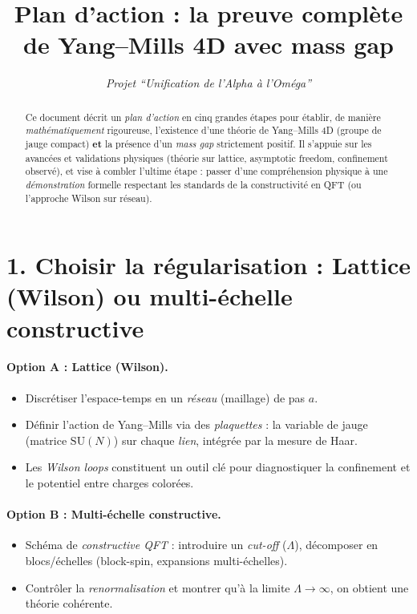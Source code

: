 \documentclass[11pt]{article}
\title{\textbf{Plan d'action : la preuve complète de Yang--Mills 4D avec mass gap}}
\author{\textit{Projet “Unification de l’Alpha à l’Oméga”}}
\date{}
\begin{document}
\maketitle

\begin{abstract}
Ce document décrit un \emph{plan d’action} en cinq grandes étapes pour établir, de manière \emph{mathématiquement} rigoureuse, l’existence d’une théorie de Yang--Mills 4D (groupe de jauge compact) \textbf{et} la présence d’un \emph{mass gap} strictement positif. Il s’appuie sur les avancées et validations physiques (théorie sur lattice, asymptotic freedom, confinement observé), et vise à combler l’ultime étape : passer d’une compréhension physique à une \emph{démonstration} formelle respectant les standards de la constructivité en QFT (ou l’approche Wilson sur réseau).
\end{abstract}

\section*{1. Choisir la régularisation : Lattice (Wilson) ou multi-échelle constructive}

\paragraph{Option A : Lattice (Wilson).}
\begin{itemize}
  \item Discrétiser l’espace-temps en un \emph{réseau} (maillage) de pas \(a\).
  \item Définir l’action de Yang--Mills via des \emph{plaquettes} : la variable de jauge (matrice \(\mathrm{SU}(N)\)) sur chaque \emph{lien}, intégrée par la mesure de Haar.
  \item Les \emph{Wilson loops} constituent un outil clé pour diagnostiquer la confinement et le potentiel entre charges colorées.
\end{itemize}

\paragraph{Option B : Multi-échelle constructive.}
\begin{itemize}
  \item Schéma de \emph{constructive QFT} : introduire un \emph{cut-off} (\(\Lambda\)), décomposer en blocs/échelles (block-spin, expansions multi-échelles).
  \item Contrôler la \emph{renormalisation} et montrer qu’à la limite \(\Lambda\to \infty\), on obtient une théorie cohérente.
\end{itemize}
\end{document}
